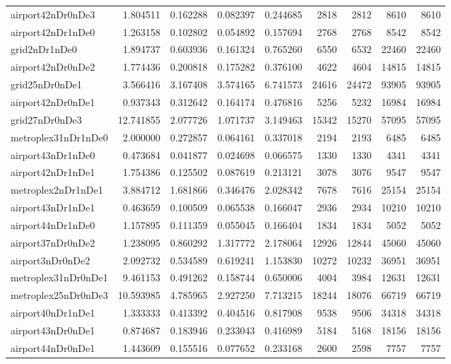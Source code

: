 \begin{longtable}{|l|r|r|r|r|r|r|r|r|}
airport42nDr0nDe3 & 1.804511 & 0.162288 & 0.082397 & 0.244685 & 2818 & 2812 & 8610 & 8610 \\
airport42nDr1nDe0 & 1.263158 & 0.102802 & 0.054892 & 0.157694 & 2768 & 2768 & 8542 & 8542 \\
grid2nDr1nDe0 & 1.894737 & 0.603936 & 0.161324 & 0.765260 & 6550 & 6532 & 22460 & 22460 \\
airport42nDr0nDe2 & 1.774436 & 0.200818 & 0.175282 & 0.376100 & 4622 & 4604 & 14815 & 14815 \\
grid25nDr0nDe1 & 3.566416 & 3.167408 & 3.574165 & 6.741573 & 24616 & 24472 & 93905 & 93905 \\
airport42nDr0nDe1 & 0.937343 & 0.312642 & 0.164174 & 0.476816 & 5256 & 5232 & 16984 & 16984 \\
grid27nDr0nDe3 & 12.741855 & 2.077726 & 1.071737 & 3.149463 & 15342 & 15270 & 57095 & 57095 \\
metroplex31nDr1nDe0 & 2.000000 & 0.272857 & 0.064161 & 0.337018 & 2194 & 2193 & 6485 & 6485 \\
airport43nDr1nDe0 & 0.473684 & 0.041877 & 0.024698 & 0.066575 & 1330 & 1330 & 4341 & 4341 \\
airport42nDr1nDe1 & 1.754386 & 0.125502 & 0.087619 & 0.213121 & 3078 & 3076 & 9547 & 9547 \\
metroplex2nDr1nDe1 & 3.884712 & 1.681866 & 0.346476 & 2.028342 & 7678 & 7616 & 25154 & 25154 \\
airport43nDr1nDe1 & 0.463659 & 0.100509 & 0.065538 & 0.166047 & 2936 & 2934 & 10210 & 10210 \\
airport44nDr1nDe0 & 1.157895 & 0.111359 & 0.055045 & 0.166404 & 1834 & 1834 & 5052 & 5052 \\
airport37nDr0nDe2 & 1.238095 & 0.860292 & 1.317772 & 2.178064 & 12926 & 12844 & 45060 & 45060 \\
airport3nDr0nDe2 & 2.092732 & 0.534589 & 0.619241 & 1.153830 & 10272 & 10232 & 36951 & 36951 \\
metroplex31nDr0nDe1 & 9.461153 & 0.491262 & 0.158744 & 0.650006 & 4004 & 3984 & 12631 & 12631 \\
metroplex25nDr0nDe3 & 10.593985 & 4.785965 & 2.927250 & 7.713215 & 18244 & 18076 & 66719 & 66719 \\
airport40nDr1nDe1 & 1.333333 & 0.413392 & 0.404516 & 0.817908 & 9538 & 9506 & 34318 & 34318 \\
airport43nDr0nDe1 & 0.874687 & 0.183946 & 0.233043 & 0.416989 & 5184 & 5168 & 18156 & 18156 \\
airport44nDr0nDe1 & 1.443609 & 0.155516 & 0.077652 & 0.233168 & 2600 & 2598 & 7757 & 7757 \\

\end{longtable}
